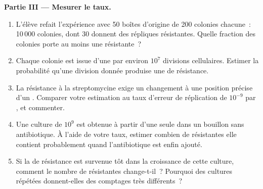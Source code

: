 \begin{problem}
\medskip
\noindent\textbf{Partie III --- Mesurer le taux.}
\begin{enumerate}[resume]
  \item L'élève refait l'expérience avec 50 boîtes d'origine de 200
        colonies chacune~: 10\,000 colonies, dont 30 donnent des
        répliques résistantes. Quelle fraction des colonies porte au
        moins une  résistante~?
  \item Chaque colonie est issue d'une  par environ $10^7$
        divisions cellulaires. Estimer la probabilité qu'une division
        donnée produise une  de résistance.
  \item La résistance à la streptomycine exige un changement à une
        position précise d'un . Comparer votre estimation au taux
        d'erreur de réplication de $10^{-9}$ par , et
        commenter.
  \item Une culture de $10^9$  est obtenue à partir d'une seule
         dans un bouillon sans antibiotique. À l'aide de votre
        taux, estimer combien de  résistantes elle contient
        probablement quand l'antibiotique est enfin ajouté.
  \item Si la  de résistance est survenue tôt dans la
        croissance de cette culture, comment le nombre de 
        résistantes change-t-il~? Pourquoi des cultures répétées
        donnent-elles des comptages très différents~?
\end{enumerate}


\end{problem}
